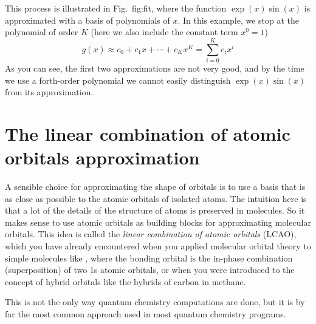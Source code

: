 \documentclass[../Main/chem371-notes.tex]{subfiles}
\begin{document}
This process is illustrated in Fig.~{fig:fit}, where the function $\exp(x) \sin(x)$ is approximated with a basis of polynomials of $x$.
In this example, we stop at the polynomial of order $K$ (here we also include the constant term $x^0 = 1$)
\begin{equation}
g(x) \approx  c_0 +  c_1 x + \cdots + c_K x^{K} = \sum_{i=0}^{K} c_i x^{i}
\end{equation}
As you can see, the first two approximations are not very good, and by the time we use a forth-order polynomial we cannot easily distinguish $\exp(x) \sin(x)$ from its approximation.

\section{The linear combination of atomic orbitals approximation}
A sensible choice for approximating the shape of orbitals is to use a basis that is as close as possible to the atomic orbitals of isolated atoms.
The intuition here is that a lot of the details of the structure of atoms is preserved in molecules.
So it makes sense to use atomic orbitals as building blocks for approximating molecular orbitals.
This idea is called the \emph{linear combination of atomic orbitals} (LCAO), which you have already encountered when you applied molecular orbital theory to simple molecules like , where the bonding orbital is the in-phase combination (superposition) of two 1s atomic orbitals, or when you were introduced to the concept of hybrid orbitals like the  hybrids of carbon in methane.

This is not the only way quantum chemistry computations are done, but it is by far the most common approach used in most quantum chemistry programs.


\end{document}
